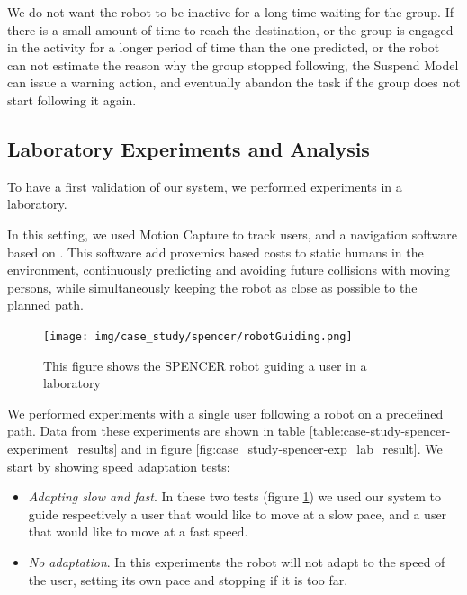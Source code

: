 We do not want the robot to be inactive for a long time  waiting for the group. If there is a small amount of time to reach the destination, or the group is engaged in the activity for a longer period of time than the one predicted, or the robot can not estimate the reason why the group stopped following, the Suspend Model can issue a warning action, and eventually abandon the task if the group does not start following it again.



\subsection{Laboratory Experiments and Analysis}
\label{subsec:case_study-spencer-lab_experiments}

To have a first validation of our system, we performed experiments in a laboratory.

In this setting, we used Motion Capture to track users, and a navigation software based on \cite{sisbotTRO2007,kruse12crossing}. This software add proxemics based costs to static humans in the environment, continuously predicting and avoiding future collisions with moving persons, while  simultaneously keeping the robot as close as possible to the planned path.

\begin{figure}[ht!]
	\centering
	\texttt{[image: img/case\_study/spencer/robotGuiding.png]}
	\caption[Robot Guide laboratory experiment]{This figure shows the SPENCER robot guiding a user in a laboratory}
	\label{fig:case_study-spencer-robotGuiding}
\end{figure}

We performed experiments with a single user following a robot on a predefined path. Data from these experiments are shown in table \ref{table:case-study-spencer-experiment_results} and in figure \ref{fig:case_study-spencer-exp_lab_result}. We start by showing speed adaptation tests:
\begin{itemize}
\item \textit{Adapting slow and fast}. In these two tests (figure \ref{fig:case_study-spencer-robotGuiding}) we used our system to guide respectively a user that would like to move at a slow pace, and a user that would like to move at a fast speed.
\item \textit{No adaptation}. In this experiments the robot will not adapt to the speed of the user, setting its own pace and stopping if it is too far.
\end{itemize}

